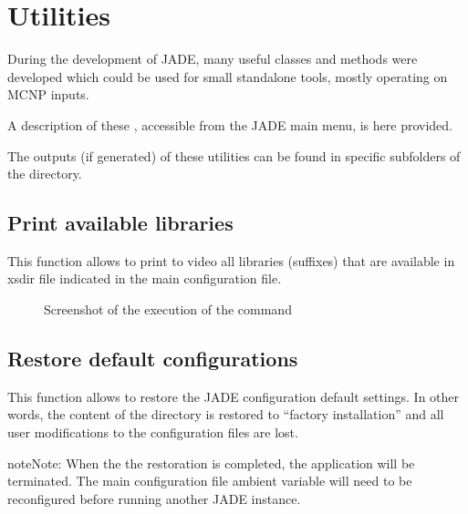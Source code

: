 \documentclass[letterpaper,10pt,english]{sphinxmanual}
\let\sphinxpxdimen\pdfpxdimen\else\newdimen\sphinxpxdimen
\begin{document}
\chapter{Utilities}
\label{\detokenize{usage/utilities:utilities}}\label{\detokenize{usage/utilities:uty}}\label{\detokenize{usage/utilities::doc}}
During the development of JADE, many useful classes and methods were developed
which could be used for small stand\sphinxhyphen{}alone tools, mostly
operating on MCNP inputs.

A description of these , accessible from the JADE main menu,
is here provided.

The outputs (if generated) of these utilities can be found in specific subfolders
of the  directory.


\section{Print available libraries}
\label{\detokenize{usage/utilities:print-available-libraries}}

This function allows to print to video all libraries (suffixes) that are
available in xsdir file indicated in the main configuration file.

\begin{figure}[htbp]
\centering
\capstart

\noindent\sphinxincludegraphics[width=600\sphinxpxdimen]{{printlib}.png}
\caption{Screenshot of the execution of the  command}\label{\detokenize{usage/utilities:id1}}\end{figure}


\section{Restore default configurations}
\label{\detokenize{usage/utilities:restore-default-configurations}}

This function allows to restore the JADE configuration default settings.
In other words, the content of the  directory
is restored to “factory installation” and all user modifications to the
configuration files are lost.

\begin{sphinxadmonition}{note}{Note:}
When the the restoration is completed, the application will be terminated.
The main configuration file ambient variable will need to be reconfigured
before running another JADE instance.
\end{sphinxadmonition}
\end{document}
